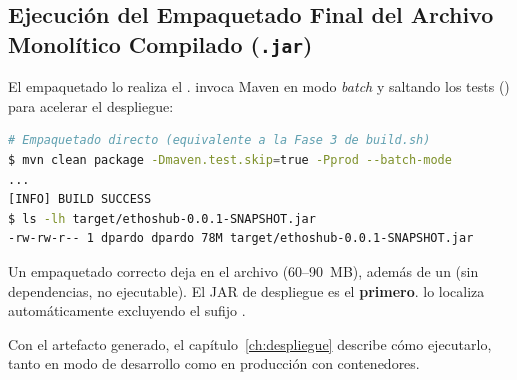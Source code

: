 \subsection[Empaquetado Final del JAR]{Ejecución del Empaquetado Final del Archivo Monolítico Compilado (\texttt{.jar})}%
\label{subsec:jar}

El empaquetado lo realiza el .  invoca
Maven en modo \textit{batch} y saltando los tests () para
acelerar el despliegue:\par

\begin{lstlisting}[language=bash]
# Empaquetado directo (equivalente a la Fase 3 de build.sh)
$ mvn clean package -Dmaven.test.skip=true -Pprod --batch-mode
...
[INFO] BUILD SUCCESS
$ ls -lh target/ethoshub-0.0.1-SNAPSHOT.jar
-rw-rw-r-- 1 dpardo dpardo 78M target/ethoshub-0.0.1-SNAPSHOT.jar
\end{lstlisting}

\begin{VerificacionOK}
Un empaquetado correcto deja en  el archivo
 (60--90~MB), además de un
 (sin dependencias, no ejecutable). El JAR de despliegue es el
\textbf{primero}.  lo localiza automáticamente excluyendo el sufijo
.
\end{VerificacionOK}

\par\vspace{0.2cm}
Con el artefacto generado, el capítulo~\ref{ch:despliegue} describe cómo ejecutarlo, tanto
en modo de desarrollo como en producción con contenedores.\par
